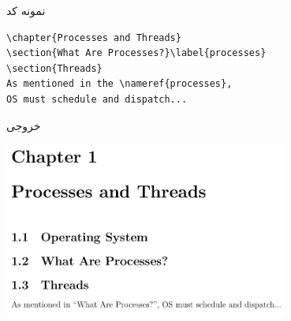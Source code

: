 \begin{frame}[fragile]{نمونه کد}
\begin{latin}
\begin{lstlisting}[keywords={chapter, section, label, ref}, keywordstyle=\color{Mulberry}\textbf]
\chapter{Processes and Threads}
\section{What Are Processes?}\label{processes}
\section{Threads}
As mentioned in the \nameref{processes},
OS must schedule and dispatch...
\end{lstlisting}
\end{latin}
\end{frame}

\begin{frame}{خروجی}
\begin{center}
\includegraphics[width=0.7\textwidth, height=0.75\textheight]{docs/images/proc-nameref-change}
\end{center}
\end{frame}
